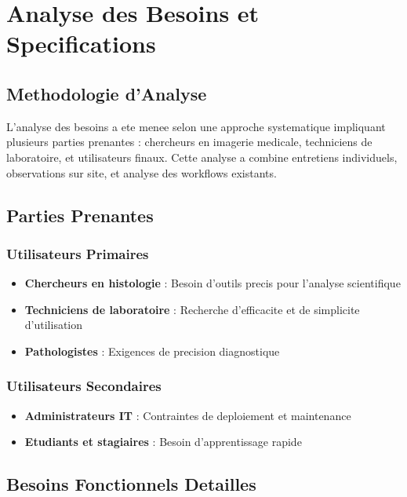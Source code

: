 \documentclass[12pt,a4paper]{article}
\begin{document}
\section{Analyse des Besoins et Specifications}

\subsection{Methodologie d'Analyse}

L'analyse des besoins a ete menee selon une approche systematique impliquant plusieurs parties prenantes : chercheurs en imagerie medicale, techniciens de laboratoire, et utilisateurs finaux. Cette analyse a combine entretiens individuels, observations sur site, et analyse des workflows existants.

\subsection{Parties Prenantes}

\subsubsection{Utilisateurs Primaires}
\begin{itemize}
\item \textbf{Chercheurs en histologie} : Besoin d'outils precis pour l'analyse scientifique
\item \textbf{Techniciens de laboratoire} : Recherche d'efficacite et de simplicite d'utilisation
\item \textbf{Pathologistes} : Exigences de precision diagnostique
\end{itemize}

\subsubsection{Utilisateurs Secondaires}
\begin{itemize}
\item \textbf{Administrateurs IT} : Contraintes de deploiement et maintenance
\item \textbf{Etudiants et stagiaires} : Besoin d'apprentissage rapide
\end{itemize}

\subsection{Besoins Fonctionnels Detailles}
\end{document}
